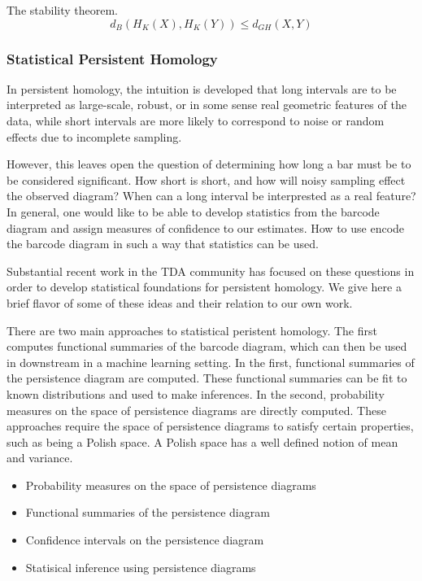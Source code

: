 \begin{thm}
\label{thm:stability}
The stability theorem.
\begin{equation}
d_{B}(H_{K}(X),H_{K}(Y)) \leq d_{GH}(X,Y)
\end{equation}
\end{thm}

\subsubsection{Statistical Persistent Homology}
\label{bg:tda:ph:statistics}

In persistent homology, the intuition is developed that long intervals are to be interpreted as large-scale, robust, or in some sense real geometric features of the data, while short intervals are more likely to correspond to noise or random effects due to incomplete sampling.

However, this leaves open the question of determining how long a bar must be to be considered significant.
How short is short, and how will noisy sampling effect the observed diagram?
When can a long interval be interprested as a real feature?
In general, one would like to be able to develop statistics from the barcode diagram and assign measures of confidence to our estimates.
How to use encode the barcode diagram in such a way that statistics can be used.

Substantial recent work in the TDA community has focused on these questions in order to develop statistical foundations for persistent homology.
We give here a brief flavor of some of these ideas and their relation to our own work.

There are two main approaches to statistical peristent homology.
The first computes functional summaries of the barcode diagram, which can then be used in downstream in a machine learning setting.
In the first, functional summaries of the persistence diagram are computed.
These functional summaries can be fit to known distributions and used to make inferences.
In the second, probability measures on the space of persistence diagrams are directly computed.
These approaches require the space of persistence diagrams to satisfy certain properties, such as being a Polish space.
A Polish space has a well defined notion of mean and variance.

\begin{itemize}
\item Probability measures on the space of persistence diagrams
\item Functional summaries of the persistence diagram
\item Confidence intervals on the persistence diagram
\item Statisical inference using persistence diagrams
\end{itemize}

